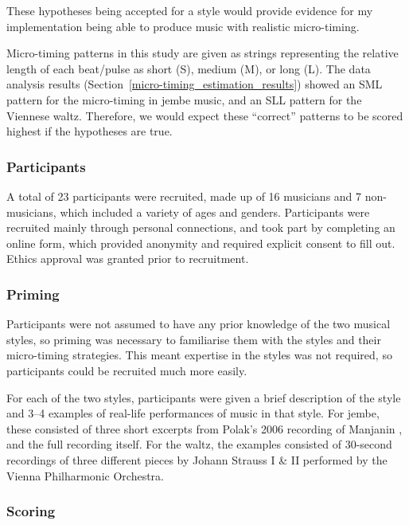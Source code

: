 \documentclass[12pt,twoside,openright]{report}
\begin{document}
These hypotheses being accepted for a style would provide evidence for my
implementation being able to produce music with realistic micro-timing.

Micro-timing patterns in this study are given as strings representing the
relative length of each beat/pulse as short (S), medium (M), or long (L). The
data analysis results (Section~\ref{micro-timing_estimation_results}) showed an SML pattern for the micro-timing in
jembe music, and an SLL pattern for the Viennese waltz. Therefore, we would
expect these ``correct'' patterns to be scored highest if the hypotheses are
true.

\subsubsection{Participants} \label{participants}

A total of 23 participants were recruited, made up of 16 musicians and 7
non-musicians, which included a variety of ages and genders. Participants were
recruited mainly through personal connections, and took part by completing an
online form, which provided anonymity and required explicit consent to fill out.
Ethics approval was granted prior to recruitment.

\subsubsection{Priming} \label{priming}

Participants were not assumed to have any prior knowledge of the two musical
styles, so priming was necessary to familiarise them with the styles and their
micro-timing strategies. This meant expertise in the styles was not required, so
participants could be recruited much more easily.

For each of the two styles, participants were given a brief description of the
style and 3--4 examples of real-life performances of music in that style. For
jembe, these consisted of three short excerpts from Polak's 2006 recording of
Manjanin \cite{polak2010}, and the full recording itself. For the waltz, the examples consisted of
30-second recordings of three different pieces by Johann Strauss I \& II
performed by the Vienna Philharmonic Orchestra.

\subsubsection{Scoring} \label{scoring}
\end{document}
